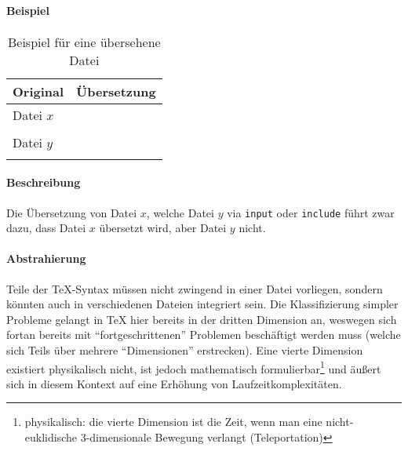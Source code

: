\paragraph*{Beispiel}
\begin{table}[h!]
    \centering
    \begin{tabularx}{\textwidth}{X X}
        \toprule
            Original & Übersetzung\\
        \midrule
            Datei $x$ & \\ 
             & \\[2em]
            Datei $y$ & \\ 
             & \\%
        \bottomrule
    \end{tabularx}
    \caption{Beispiel für eine übersehene Datei}\label{tab:problems:dim3}
\end{table}
\paragraph*{Beschreibung}
Die Übersetzung von Datei $x$, welche Datei $y$ via \texttt{input} oder \texttt{include} %
führt zwar dazu, dass Datei $x$ übersetzt wird, aber Datei $y$ nicht.
\paragraph*{Abstrahierung}%
Teile der \TeX-Syntax müssen nicht zwingend in einer Datei vorliegen, sondern könnten auch in verschiedenen Dateien integriert sein. Die Klassifizierung simpler Probleme gelangt in \TeX{} hier bereits in der dritten Dimension an, weswegen sich fortan bereits mit \enquote{fortgeschrittenen} Problemen beschäftigt werden muss (welche sich Teils über mehrere \enquote{Dimensionen} erstrecken). Eine vierte Dimension existiert physikalisch nicht, ist jedoch mathematisch formulierbar\footnote{physikalisch: die vierte Dimension ist die Zeit, wenn man eine nicht-euklidische 3-dimensionale Bewegung verlangt (Teleportation)} und äußert sich in diesem Kontext auf eine Erhöhung von Laufzeitkomplexitäten.

